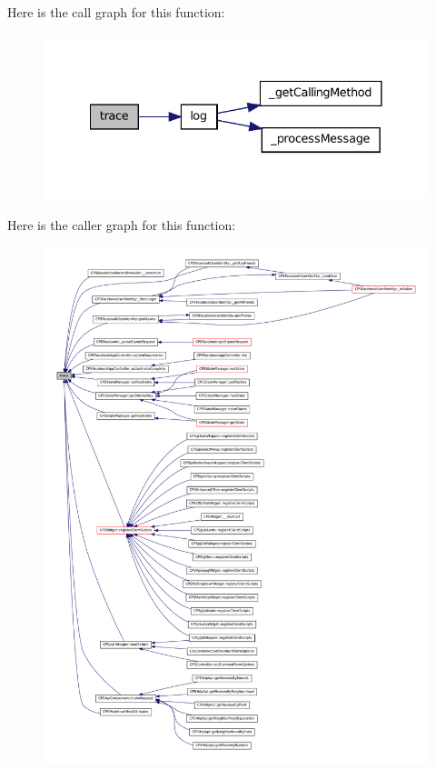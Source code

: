 Here is the call graph for this function:\nopagebreak
\begin{figure}[H]
\begin{center}
\leavevmode
\includegraphics[width=332pt]{classCPSLog_ab8a624f93a0bfc699dd00c01af886955_cgraph}
\end{center}
\end{figure}




Here is the caller graph for this function:\nopagebreak
\begin{figure}[H]
\begin{center}
\leavevmode
\includegraphics[width=400pt]{classCPSLog_ab8a624f93a0bfc699dd00c01af886955_icgraph}
\end{center}
\end{figure}


